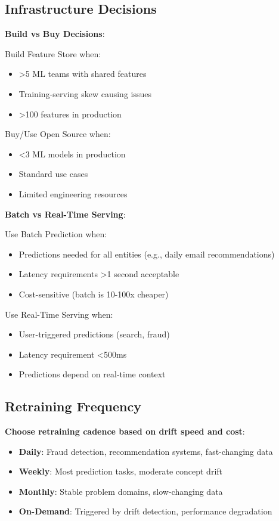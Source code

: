 \subsection{Infrastructure Decisions}

\textbf{Build vs Buy Decisions}:

Build Feature Store when:
\begin{itemize}
    \item >5 ML teams with shared features
    \item Training-serving skew causing issues
    \item >100 features in production
\end{itemize}

Buy/Use Open Source when:
\begin{itemize}
    \item <3 ML models in production
    \item Standard use cases
    \item Limited engineering resources
\end{itemize}

\textbf{Batch vs Real-Time Serving}:

Use Batch Prediction when:
\begin{itemize}
    \item Predictions needed for all entities (e.g., daily email recommendations)
    \item Latency requirements >1 second acceptable
    \item Cost-sensitive (batch is 10-100x cheaper)
\end{itemize}

Use Real-Time Serving when:
\begin{itemize}
    \item User-triggered predictions (search, fraud)
    \item Latency requirement <500ms
    \item Predictions depend on real-time context
\end{itemize}

\subsection{Retraining Frequency}

\textbf{Choose retraining cadence based on drift speed and cost}:

\begin{itemize}
    \item \textbf{Daily}: Fraud detection, recommendation systems, fast-changing data
    \item \textbf{Weekly}: Most prediction tasks, moderate concept drift
    \item \textbf{Monthly}: Stable problem domains, slow-changing data
    \item \textbf{On-Demand}: Triggered by drift detection, performance degradation
\end{itemize}

